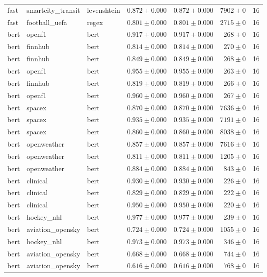 \begin{table}[htbp]
\begin{tabular}{l l l r r r r}
fast & smartcity\_transit & levenshtein & $0.872\pm0.000$ & $0.872\pm0.000$ & $7902\pm0$ & 16 \\
fast & football\_uefa & regex & $0.801\pm0.000$ & $0.801\pm0.000$ & $2715\pm0$ & 16 \\
bert & openf1 & bert & $0.917\pm0.000$ & $0.917\pm0.000$ & $268\pm0$ & 16 \\
bert & finnhub & bert & $0.814\pm0.000$ & $0.814\pm0.000$ & $270\pm0$ & 16 \\
bert & finnhub & bert & $0.849\pm0.000$ & $0.849\pm0.000$ & $268\pm0$ & 16 \\
bert & openf1 & bert & $0.955\pm0.000$ & $0.955\pm0.000$ & $263\pm0$ & 16 \\
bert & finnhub & bert & $0.819\pm0.000$ & $0.819\pm0.000$ & $266\pm0$ & 16 \\
bert & openf1 & bert & $0.960\pm0.000$ & $0.960\pm0.000$ & $267\pm0$ & 16 \\
bert & spacex & bert & $0.870\pm0.000$ & $0.870\pm0.000$ & $7636\pm0$ & 16 \\
bert & spacex & bert & $0.935\pm0.000$ & $0.935\pm0.000$ & $7191\pm0$ & 16 \\
bert & spacex & bert & $0.860\pm0.000$ & $0.860\pm0.000$ & $8038\pm0$ & 16 \\
bert & openweather & bert & $0.857\pm0.000$ & $0.857\pm0.000$ & $7616\pm0$ & 16 \\
bert & openweather & bert & $0.811\pm0.000$ & $0.811\pm0.000$ & $1205\pm0$ & 16 \\
bert & openweather & bert & $0.884\pm0.000$ & $0.884\pm0.000$ & $843\pm0$ & 16 \\
bert & clinical & bert & $0.930\pm0.000$ & $0.930\pm0.000$ & $226\pm0$ & 16 \\
bert & clinical & bert & $0.829\pm0.000$ & $0.829\pm0.000$ & $222\pm0$ & 16 \\
bert & clinical & bert & $0.950\pm0.000$ & $0.950\pm0.000$ & $220\pm0$ & 16 \\
bert & hockey\_nhl & bert & $0.977\pm0.000$ & $0.977\pm0.000$ & $239\pm0$ & 16 \\
bert & aviation\_opensky & bert & $0.724\pm0.000$ & $0.724\pm0.000$ & $1055\pm0$ & 16 \\
bert & hockey\_nhl & bert & $0.973\pm0.000$ & $0.973\pm0.000$ & $346\pm0$ & 16 \\
bert & aviation\_opensky & bert & $0.668\pm0.000$ & $0.668\pm0.000$ & $744\pm0$ & 16 \\
bert & aviation\_opensky & bert & $0.616\pm0.000$ & $0.616\pm0.000$ & $768\pm0$ & 16 \\

\end{tabular}
\end{table}
